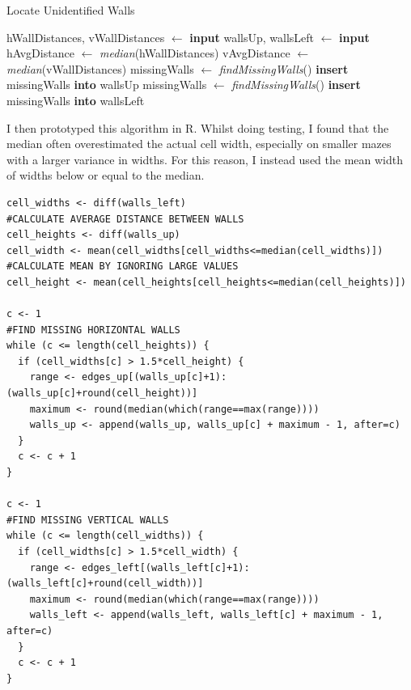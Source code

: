 \documentclass[titlepage]{article}
\begin{document}
\begin{algorithm}[H]
\caption{Locate Unidentified Walls}
\begin{algorithmic}[1]
    	\State hWallDistances, vWallDistances $\gets$ \textbf{input}
    	\State wallsUp, wallsLeft $\gets$ \textbf{input}
    	\State hAvgDistance $\gets$ \textit{median}(hWallDistances)
    	\State vAvgDistance $\gets$ \textit{median}(vWallDistances)
			\State missingWalls $\gets$ \textit{findMissingWalls}()
			\State \textbf{insert} missingWalls \textbf{into} wallsUp
		\EndIf
	\EndFor
			\State missingWalls $\gets$ \textit{findMissingWalls}()
			\State \textbf{insert} missingWalls \textbf{into} wallsLeft
		\EndIf
	\EndFor
\end{algorithmic}
\end{algorithm}

I then prototyped this algorithm in R. Whilst doing testing, I found that the median often overestimated the actual cell width, especially on smaller mazes with a larger variance in widths. For this reason, I instead used the mean width of widths below or equal to the median. 

\begin{changemargin}{-1in}{-1in} 
\begin{verbatim}
cell_widths <- diff(walls_left)                                                 #CALCULATE AVERAGE DISTANCE BETWEEN WALLS
cell_heights <- diff(walls_up)
cell_width <- mean(cell_widths[cell_widths<=median(cell_widths)])               #CALCULATE MEAN BY IGNORING LARGE VALUES
cell_height <- mean(cell_heights[cell_heights<=median(cell_heights)])

c <- 1                                                                          #FIND MISSING HORIZONTAL WALLS
while (c <= length(cell_heights)) {
  if (cell_widths[c] > 1.5*cell_height) {
    range <- edges_up[(walls_up[c]+1):(walls_up[c]+round(cell_height))]
    maximum <- round(median(which(range==max(range))))
    walls_up <- append(walls_up, walls_up[c] + maximum - 1, after=c)
  }
  c <- c + 1
}

c <- 1                                                                          #FIND MISSING VERTICAL WALLS
while (c <= length(cell_widths)) {
  if (cell_widths[c] > 1.5*cell_width) {
    range <- edges_left[(walls_left[c]+1):(walls_left[c]+round(cell_width))]
    maximum <- round(median(which(range==max(range))))
    walls_left <- append(walls_left, walls_left[c] + maximum - 1, after=c)
  }
  c <- c + 1
}
\end{verbatim}
\end{changemargin} 
\end{document}
